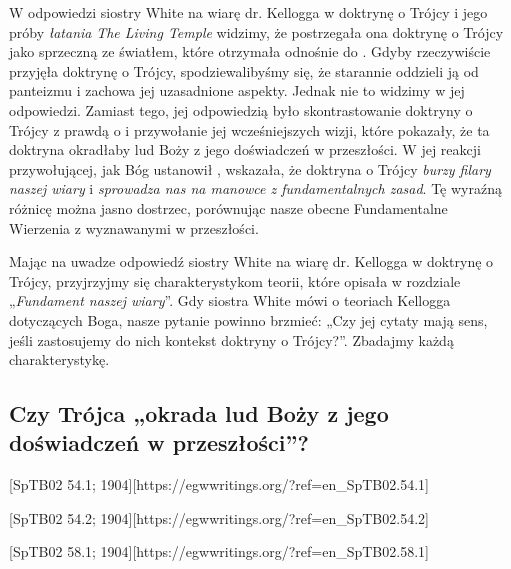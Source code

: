 
W odpowiedzi siostry White na wiarę dr. Kellogga w doktrynę o Trójcy i jego próby \textit{łatania} \textit{The Living Temple} widzimy, że postrzegała ona doktrynę o Trójcy jako sprzeczną ze światłem, które otrzymała odnośnie do . Gdyby rzeczywiście przyjęła doktrynę o Trójcy, spodziewalibyśmy się, że starannie oddzieli ją od panteizmu i zachowa jej uzasadnione aspekty. Jednak nie to widzimy w jej odpowiedzi. Zamiast tego, jej odpowiedzią było skontrastowanie doktryny o Trójcy z prawdą o  i przywołanie jej wcześniejszych wizji, które pokazały, że ta doktryna okradłaby lud Boży z jego doświadczeń w przeszłości. W jej reakcji przywołującej, jak Bóg ustanowił , wskazała, że doktryna o Trójcy \textit{burzy filary naszej wiary} i \textit{sprowadza nas na manowce z fundamentalnych zasad}. Tę wyraźną różnicę można jasno dostrzec, porównując nasze obecne Fundamentalne Wierzenia z  wyznawanymi w przeszłości.

Mając na uwadze odpowiedź siostry White na wiarę dr. Kellogga w doktrynę o Trójcy, przyjrzyjmy się charakterystykom teorii, które opisała w rozdziale „\textit{Fundament naszej wiary}”. Gdy siostra White mówi o teoriach Kellogga dotyczących Boga, nasze pytanie powinno brzmieć: „Czy jej cytaty mają sens, jeśli zastosujemy do nich kontekst doktryny o Trójcy?”. Zbadajmy każdą charakterystykę.

\subsection*{Czy Trójca „okrada lud Boży z jego doświadczeń w przeszłości”?}

[SpTB02 54.1; 1904][https://egwwritings.org/?ref=en\_SpTB02.54.1]

[SpTB02 54.2; 1904][https://egwwritings.org/?ref=en\_SpTB02.54.2]

[SpTB02 58.1; 1904][https://egwwritings.org/?ref=en\_SpTB02.58.1]

